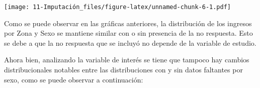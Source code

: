 \documentclass[
  12pt,
]{book}
\newenvironment{Shaded}{\begin{snugshade}}{\end{snugshade}}
\newcommand{\AttributeTok}[1]{\textcolor[rgb]{0.77,0.63,0.00}{#1}}
\newcommand{\FunctionTok}[1]{\textcolor[rgb]{0.00,0.00,0.00}{#1}}
\newcommand{\NormalTok}[1]{#1}
\newcommand{\OtherTok}[1]{\textcolor[rgb]{0.56,0.35,0.01}{#1}}
\newcommand{\SpecialCharTok}[1]{\textcolor[rgb]{0.00,0.00,0.00}{#1}}
\newcommand{\StringTok}[1]{\textcolor[rgb]{0.31,0.60,0.02}{#1}}
\begin{document}
\begin{Shaded}
\end{Shaded}

\texttt{[image: 11-Imputación\_files/figure-latex/unnamed-chunk-6-1.pdf]}

Como se puede observar en las gráficas anteriores, la distribución de los ingresos por Zona y Sexo se mantiene similar con o sin presencia de la no respuesta. Esto se debe a que la no respuesta que se incluyó no depende de la variable de estudio.

Ahora bien, analizando la variable de interés se tiene que tampoco hay cambios distribucionales notables entre las distribuciones con y sin datos faltantes por sexo, como se puede observar a continuación:
\end{document}
